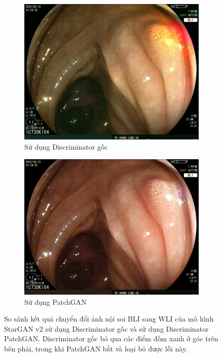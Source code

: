 \documentclass[12pt]{extreport}
\begin{document}
\begin{figure}[H]
    \centering
    \begin{subfigure}[H]{0.48\textwidth}
        \centering
        \includegraphics[width=\linewidth]{figure36.jpg}
        \caption{Sử dụng Discriminator gốc}
    \end{subfigure}
    \begin{subfigure}[H]{0.48\textwidth}
        \centering
        \includegraphics[width=\linewidth]{figure35.jpg}
        \caption{Sử dụng PatchGAN}
    \end{subfigure}
    \caption{So sánh kết quả chuyển đổi ảnh nội soi BLI sang WLI của mô hình StarGAN v2 sử dụng Discriminator gốc và sử dụng Discriminator PatchGAN. Discriminator gốc bỏ qua các điểm đốm xanh ở góc trên bên phải, trong khi PatchGAN bắt và loại bỏ được lỗi này.}
\end{figure}
\end{document}
